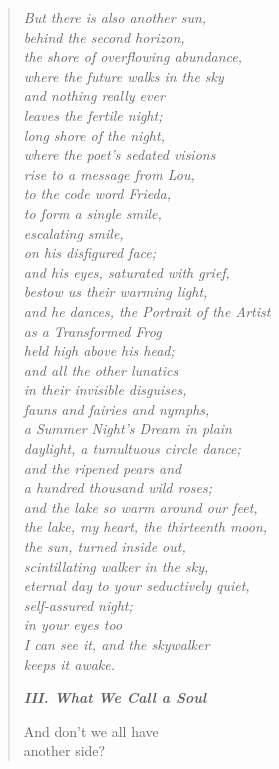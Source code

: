 \begin{verse}
{\itshape But there is also another sun,\\
behind the second horizon,\\
the shore of overflowing abundance,\\
where the future walks in the sky\\
and nothing really ever\\
leaves the fertile night;\\
long shore of the night,\\
where the poet's sedated visions\\
rise to a message from Lou,\\
to the code word {\upshape Frieda,}\\
to form a single smile,\\
escalating smile,\\
on his disfigured face;\\
and his eyes, saturated with grief,\\
bestow us their warming light,\\
and he dances, the {\upshape Portrait of the Artist}\\
as a Transformed Frog\\
held high above his head;\\
and all the other lunatics\\
in their invisible disguises,\\
fauns and fairies and nymphs,\\
a {\upshape Summer Night's Dream} in plain\label{summer-nights}\\
daylight, a tumultuous circle dance;\\
and the ripened pears and\\
a hundred thousand wild roses;\\
and the lake so warm around our feet,\\
the lake, my heart, the thirteenth moon,\\
the sun, turned inside out,\\
scintillating walker in the sky,\\
eternal day to your seductively quiet,\\
self-assured night;\\
in your eyes too\\
I can see it, and the skywalker\\
keeps it awake.}

{\bfseries\itshape III. What We Call a Soul}

And don't we all have\\
another side?


\end{verse}
